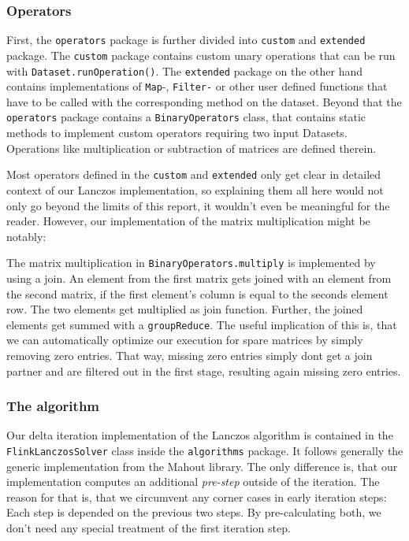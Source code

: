 \subsubsection{Operators}

First, the \texttt{operators} package is further divided into \texttt{custom}
and \texttt{extended} package. The \texttt{custom} package contains custom
unary operations that can be run with \texttt{Dataset.runOperation()}. The
\texttt{extended} package on the other hand contains implementations of
\texttt{Map}-, \texttt{Filter-} or other user defined functions that have to be
called with the corresponding method on the dataset. Beyond that the
\texttt{operators} package contains a \texttt{BinaryOperators} class, that
contains static methods to implement custom operators requiring two input
Datasets. Operations like multiplication or subtraction of matrices are defined
therein.

Most operators defined in the \texttt{custom} and \texttt{extended} only get
clear in detailed context of our Lanczos implementation, so explaining them all
here would not only go beyond the limits of this report, it wouldn't even be
meaningful for the reader. However, our implementation of the matrix
multiplication might be notably:

The matrix multiplication in \texttt{BinaryOperators.multiply} is implemented
by using a join. An element from the first matrix gets joined with an element
from the second matrix, if the first element's column is equal to the seconds
element row. The two elements get multiplied as join function. Further, the
joined elements get summed with a \texttt{groupReduce}. The useful implication
of this is, that we can automatically optimize our execution for spare matrices
by simply removing zero entries. That way, missing zero entries simply dont get
a join partner and are filtered out in the first stage, resulting again missing
zero entries.

\subsubsection{The algorithm}

Our delta iteration implementation of the Lanczos algorithm is contained in the
\texttt{FlinkLanczosSolver} class inside the \texttt{algorithms} package. It
follows generally the generic implementation from the Mahout library. The only
difference is, that our implementation computes an additional \textit{pre-step}
outside of the iteration. The reason for that is, that we circumvent any corner
cases in early iteration steps: Each step is depended on the previous two
steps. By pre-calculating both, we don't need any special treatment of the
first iteration step.

